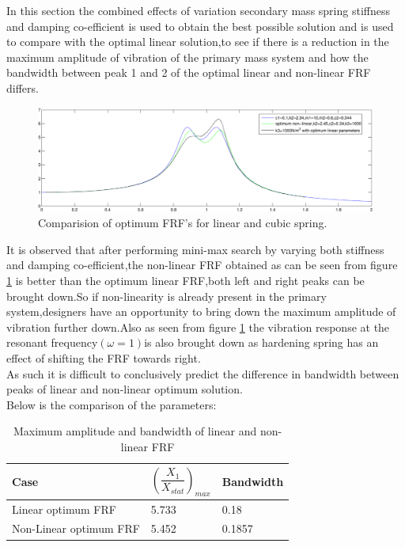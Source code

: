 In this section the combined effects of variation secondary mass spring stiffness and damping co-efficient is used to obtain the best possible solution and is used to compare with the optimal linear solution,to see if there is a reduction in the maximum amplitude of vibration of the primary mass system and how the bandwidth between peak 1 and 2 of the optimal linear and non-linear FRF differs.
\begin{figure}[h!]
\includegraphics[width=\textwidth,height=0.5\textwidth]{"figures/nonlinearity_primaryymass_1"}
\caption{Comparision of optimum FRF's for linear and cubic spring.}
  \label{fig:optimum FRF}
\end{figure}
It is observed that after performing mini-max search by varying both stiffness and damping co-efficient,the non-linear FRF obtained as can be seen from figure \ref{fig:optimum FRF} is better than the optimum linear FRF,both left and right peaks can be brought down.So if non-linearity is already present in the primary system,designers have an opportunity to bring down the maximum amplitude of vibration further down.Also as seen from figure \ref{fig:optimum FRF} the vibration response at the resonant frequency$(\omega=1)$is also brought down as hardening spring has an effect of shifting the FRF towards right.\\
As such it is difficult to conclusively predict the difference in bandwidth between peaks of linear and non-linear optimum solution.\\
Below is the comparison of the parameters:
\begin{table}[h!]
\centering
\caption{Maximum amplitude and bandwidth of linear and non-linear FRF}
\begin{tabular}{|m{6cm}|m{2cm}|m{2cm}|} 
\hline
Case& $\left(\dfrac{X_{1}}{X_{stat}}\right)_{max}$ & Bandwidth \\
\hline
Linear optimum FRF & 5.733 & 0.18 

\\
\hline
Non-Linear optimum FRF & 5.452 & 0.1857

 \\ 
\hline
\end{tabular}
\end{table}
